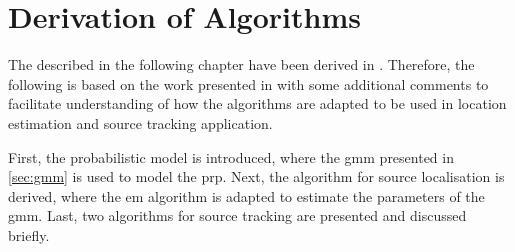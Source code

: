 \chapter{Derivation of Algorithms}
\label{chap:algorithms}

The described in the following chapter have been derived in \cite{Schwartz2014}. Therefore, the following is based on the work presented in \cite{Schwartz2014} with some additional comments to facilitate understanding of how the algorithms are adapted to be used in location estimation and source tracking application.

First, the probabilistic model is introduced, where the \gls{gmm} presented in \autoref{sec:gmm} is used to model the \gls{prp}. Next, the algorithm for source localisation is derived, where the \gls{em} algorithm is adapted to estimate the parameters of the \gls{gmm}. Last, two algorithms for source tracking are presented and discussed briefly.
